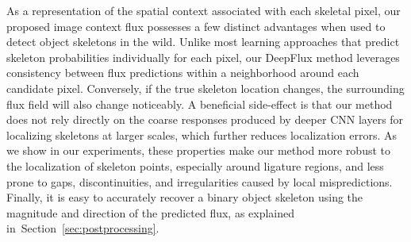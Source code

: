 \documentclass[10pt,twocolumn,letterpaper]{article}
\newcommand{\st}[1]{\textcolor{red}{\bf [ST: #1]}}
\newcommand{\refsec}[1]{Section~\ref{#1}}
\begin{document}
As a representation of the spatial context associated with each skeletal pixel, our proposed image context flux possesses a few distinct advantages when used to detect object skeletons in the wild.
Unlike most learning approaches that predict skeleton probabilities individually for each pixel, our DeepFlux method leverages consistency between flux predictions within a neighborhood around each candidate pixel.
Conversely, if the true skeleton location changes, the surrounding flux field will also change noticeably.
A beneficial side-effect is that our method does not rely directly on the coarse responses produced by deeper CNN layers for localizing skeletons at larger scales, which further reduces localization errors.
As we show in our experiments, these properties make our method more robust to the localization of skeleton points, especially around ligature regions, and less prone to gaps, discontinuities, and irregularities caused by local mispredictions.
Finally, it is easy to accurately recover a binary object skeleton using the magnitude and direction of the predicted flux, as explained in~\refsec{sec:postprocessing}.


\end{document}

